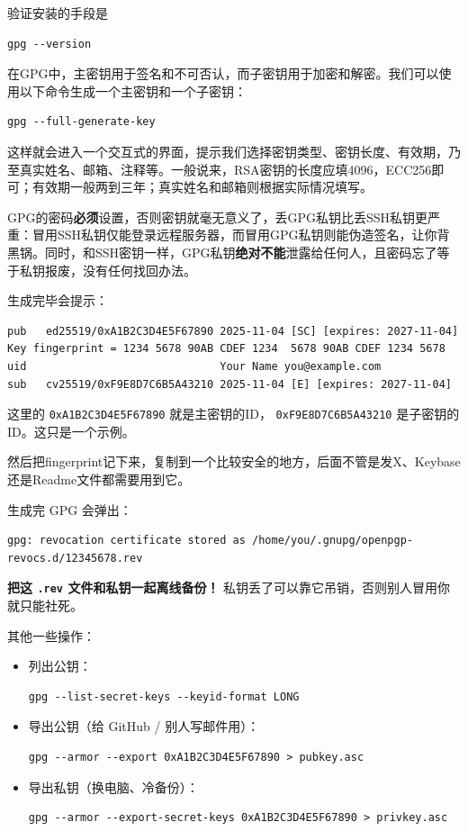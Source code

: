 验证安装的手段是
\begin{verbatim}
gpg --version
\end{verbatim}

在GPG中，主密钥用于签名和不可否认，而子密钥用于加密和解密。我们可以使用以下命令生成一个主密钥和一个子密钥：
\begin{verbatim}
gpg --full-generate-key
\end{verbatim}
这样就会进入一个交互式的界面，提示我们选择密钥类型、密钥长度、有效期，乃至真实姓名、邮箱、注释等。一般说来，RSA密钥的长度应填4096，ECC256即可；有效期一般两到三年；真实姓名和邮箱则根据实际情况填写。

GPG的密码\textbf{\color{red}必须}设置，否则密钥就毫无意义了，丢GPG私钥比丢SSH私钥更严重：冒用SSH私钥仅能登录远程服务器，而冒用GPG私钥则能伪造签名，让你背黑锅。同时，和SSH密钥一样，GPG私钥\textbf{\color{red}绝对不能}泄露给任何人，且密码忘了等于私钥报废，没有任何找回办法。

生成完毕会提示：
\begin{verbatim}
pub   ed25519/0xA1B2C3D4E5F67890 2025-11-04 [SC] [expires: 2027-11-04]
Key fingerprint = 1234 5678 90AB CDEF 1234  5678 90AB CDEF 1234 5678
uid                              Your Name you@example.com
sub   cv25519/0xF9E8D7C6B5A43210 2025-11-04 [E] [expires: 2027-11-04]
\end{verbatim}
这里的  \texttt{0xA1B2C3D4E5F67890}  就是主密钥的ID， \texttt{0xF9E8D7C6B5A43210}  是子密钥的ID。这只是一个示例。

然后把fingerprint记下来，复制到一个比较安全的地方，后面不管是发X、Keybase还是Readme文件都需要用到它。

生成完 GPG 会弹出：
\begin{verbatim}
gpg: revocation certificate stored as /home/you/.gnupg/openpgp-revocs.d/12345678.rev
\end{verbatim}
\textbf{\color{red}把这  \texttt{.rev}  文件和私钥一起离线备份！}
私钥丢了可以靠它吊销，否则别人冒用你就只能社死。

其他一些操作：

\begin{itemize}
  \item 列出公钥：
\begin{verbatim}
gpg --list-secret-keys --keyid-format LONG
\end{verbatim}
\item 导出公钥（给 GitHub / 别人写邮件用）：
\begin{verbatim}
gpg --armor --export 0xA1B2C3D4E5F67890 > pubkey.asc
\end{verbatim}
\item 导出私钥（换电脑、冷备份）：
\begin{verbatim}
gpg --armor --export-secret-keys 0xA1B2C3D4E5F67890 > privkey.asc
\end{verbatim}
\end{itemize}

